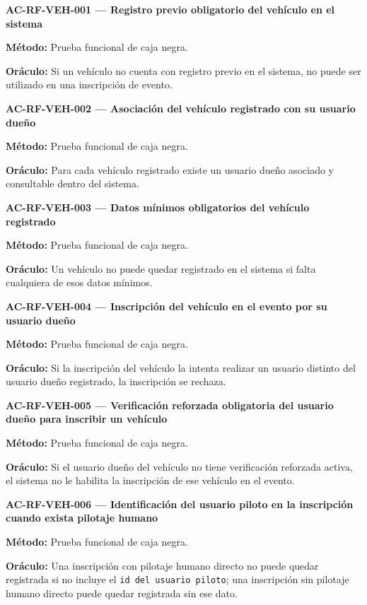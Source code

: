 \documentclass[10pt,letterpaper]{article}
\begin{document}
\noindent\textbf{AC-RF-VEH-001 --- Registro previo obligatorio del vehículo en el sistema}\par
\textbf{Método:} Prueba funcional de caja negra.\par
\textbf{Oráculo:} Si un vehículo no cuenta con registro previo en el sistema, no puede ser utilizado en una inscripción de evento.\par\vspace{0.45em}
\noindent\textbf{AC-RF-VEH-002 --- Asociación del vehículo registrado con su usuario dueño}\par
\textbf{Método:} Prueba funcional de caja negra.\par
\textbf{Oráculo:} Para cada vehículo registrado existe un usuario dueño asociado y consultable dentro del sistema.\par\vspace{0.45em}
\noindent\textbf{AC-RF-VEH-003 --- Datos mínimos obligatorios del vehículo registrado}\par
\textbf{Método:} Prueba funcional de caja negra.\par
\textbf{Oráculo:} Un vehículo no puede quedar registrado en el sistema si falta cualquiera de esos datos mínimos.\par\vspace{0.45em}
\noindent\textbf{AC-RF-VEH-004 --- Inscripción del vehículo en el evento por su usuario dueño}\par
\textbf{Método:} Prueba funcional de caja negra.\par
\textbf{Oráculo:} Si la inscripción del vehículo la intenta realizar un usuario distinto del usuario dueño registrado, la inscripción se rechaza.\par\vspace{0.45em}
\noindent\textbf{AC-RF-VEH-005 --- Verificación reforzada obligatoria del usuario dueño para inscribir un vehículo}\par
\textbf{Método:} Prueba funcional de caja negra.\par
\textbf{Oráculo:} Si el usuario dueño del vehículo no tiene verificación reforzada activa, el sistema no le habilita la inscripción de ese vehículo en el evento.\par\vspace{0.45em}
\noindent\textbf{AC-RF-VEH-006 --- Identificación del usuario piloto en la inscripción cuando exista pilotaje humano}\par
\textbf{Método:} Prueba funcional de caja negra.\par
\textbf{Oráculo:} Una inscripción con pilotaje humano directo no puede quedar registrada si no incluye el \texttt{id del usuario piloto}; una inscripción sin pilotaje humano directo puede quedar registrada sin ese dato.\par\vspace{0.45em}
\end{document}
